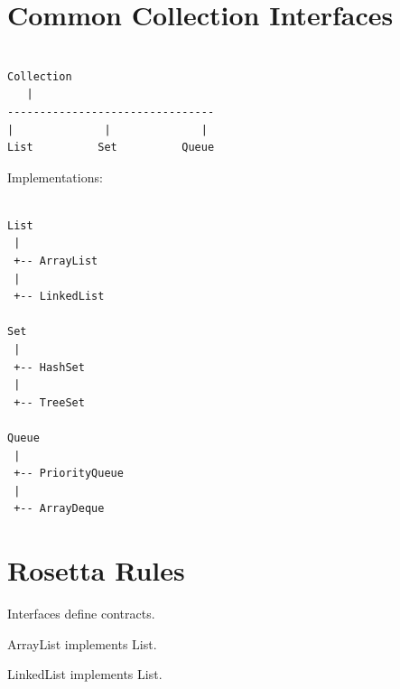 \documentclass[11pt,a4paper]{book}
\begin{document}

\section{Common Collection Interfaces}

\begin{verbatim}

Collection
   |
--------------------------------
|              |              |
List          Set          Queue

\end{verbatim}


Implementations:

\begin{verbatim}

List
 |
 +-- ArrayList
 |
 +-- LinkedList

Set
 |
 +-- HashSet
 |
 +-- TreeSet

Queue
 |
 +-- PriorityQueue
 |
 +-- ArrayDeque

\end{verbatim}


\section{Rosetta Rules}

\begin{rosettarule}

Interfaces define contracts.

\end{rosettarule}


\begin{rosettarule}

ArrayList implements List.

\end{rosettarule}


\begin{rosettarule}

LinkedList implements List.

\end{rosettarule}
\end{document}
